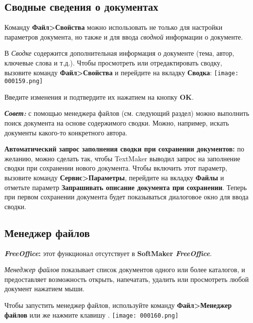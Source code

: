 ﻿\documentclass[a4paper,10pt]{article}
\begin{document}
\subsection{Сводные сведения о документах} \label{sec:сводсведенияодок}
Команду \textbf{Файл>Свойства} можно использовать не только для настройки параметров документа, но также и для ввода \textit{сводной} информации о документе.

В \textit{Сводке} содержится дополнительная информация о документе (тема, автор, ключевые слова и т.д.). Чтобы просмотреть или отредактировать сводку, вызовите команду \textbf{Файл>Свойства} и перейдите на вкладку \textbf{Сводка}:
\newline
\newline
\texttt{[image: 000159.png]}

Введите изменения и подтвердите их нажатием на кнопку \textbf{OK}.

\begin{mdframed}[backgroundcolor=blue!10]
\textbf{\textit{Совет:}} с помощью менеджера файлов (см. следующий раздел) можно выполнить поиск документа на основе содержимого сводки. Можно, например, искать документы какого-то конкретного автора.
\end{mdframed}

\textbf{Автоматический запрос заполнения сводки при сохранении документов:} по желанию, можно сделать так, чтобы TextMaker выводил запрос на заполнение сводки при сохранении нового документа. Чтобы включить этот параметр, вызовите команду \textbf{Сервис>Параметры}, перейдите на вкладку \textbf{Файлы} и отметьте параметр \textbf{Запрашивать описание документа при сохранении}. Теперь при первом сохранении документа будет показываться диалоговое окно для ввода сводки.

\subsection{Менеджер файлов} \label{sec:менеджфайлов}
\begin{mdframed}[backgroundcolor=pink!50]
\textbf{\textit{FreeOffice}:} этот функционал отсутствует в \textbf{SoftMaker \textit{FreeOffice}}.
\end{mdframed}

\textit{Менеджер файлов} показывает список документов одного или более каталогов, и предоставляет возможность открыть, напечатать, удалить или просмотреть любой документ нажатием мыши.


Чтобы запустить менеджер файлов, используйте команду \textbf{Файл>Менеджер файлов} или же нажмите клавишу .
\newline
\newline
\texttt{[image: 000160.png]}
\end{document}
